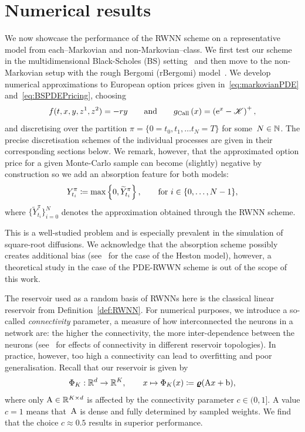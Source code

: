 \section{Numerical results}\label{sec:RWNN_numerical_results}
We now showcase the performance of the RWNN scheme on a representative model from each--Markovian and non-Markovian--class. 
We first test our scheme in the multidimensional Black-Scholes (BS) setting~\cite{Black1973TheLiabilities} and then move to the non-Markovian setup with the rough Bergomi (rBergomi) model~\cite{Bayer2015PricingVolatility}. 
We develop numerical approximations to European option prices given in~\eqref{eq:markovianPDE} and~\eqref{eq:BSPDEPricing}, choosing
\[
f(t, x, y, z^1, z^2) = -r y
\qquad \text {and} \qquad 
g_{\textup{Call}}\left(x\right) = \left(\mathrm{e}^x-\mathscr{K}\right)^{+},
\]
and discretising over the partition $\pi=\{0=t_0, t_1, \dots t_N=T\}$ for some~$N\in\mathbb{N}$. 
The precise discretisation schemes of the individual processes are given in their corresponding sections below. 
We remark, however, that the approximated option price for a given Monte-Carlo sample can become (slightly) negative by construction so we add an absorption feature for both models:
\begin{equation}\label{eq:absorption_scheme}
Y^\pi_{t_i} \coloneqq  \max\left\{0,\widetilde Y^\pi_{t_i}\right\}, \qquad \text{for } i\in\{0, \dots, N-1\},
\end{equation}
where $\big\{\widetilde Y^\pi_{t_i}\big\}_{i=0}^N$ denotes the approximation obtained through the RWNN scheme.


\begin{remark}\label{rem:abs_scheme}
    This is a well-studied problem and is especially prevalent in the simulation of square-root diffusions. We acknowledge that the absorption scheme possibly creates additional bias (see~\cite{Lord2009AModels} for the case of the Heston model), however, a theoretical study in the case of the PDE-RWWN scheme is out of the scope of this work.
\end{remark}

The reservoir used as a random basis of RWNNs here is the classical linear reservoir from Definition~\ref{def:RWNN}. 
For numerical purposes, we introduce a so-called \textit{connectivity} parameter, a measure of how interconnected the neurons in a network are:
the higher the connectivity, the more inter-dependence between the neurons (see~\cite{Dale2021ReservoirTopology} for effects of connectivity in different reservoir topologies). 
In practice, however, too high a connectivity can lead to overfitting and poor generalisation. 
Recall that our reservoir is given by
\[
\Phi_K: \mathbb{R}^d \rightarrow \mathbb{R}^K, \qquad x\mapsto\Phi_K(x)\coloneqq\boldsymbol\varrho(\mathrm{A} x+\mathrm{b}),
\]
where only $\mathrm{A}\in\mathbb{R}^{K\times d}$ is affected by the connectivity parameter $c\in(0,1]$. 
A value $c=1$ means that~$\mathrm{A}$ is dense and fully determined by sampled weights. 
We find that the choice $c\approx 0.5$ results in superior performance.

